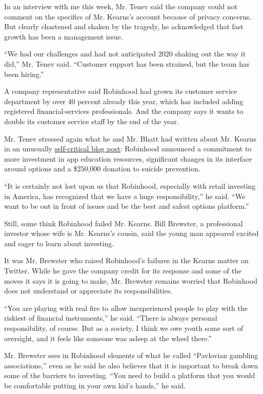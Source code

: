 In an interview with me this week, Mr. Tenev said the company could not
comment on the specifics of Mr. Kearns's account because of privacy
concerns. But clearly chastened and shaken by the tragedy, he
acknowledged that fast growth has been a management issue.

``We had our challenges and had not anticipated 2020 shaking out the way
it did,'' Mr. Tenev said. ``Customer support has been strained, but the
team has been hiring.''

A company representative said Robinhood had grown its customer service
department by over 40 percent already this year, which has included
adding registered financial-services professionals. And the company says
it wants to double its customer service staff by the end of the year.

Mr. Tenev stressed again what he and Mr. Bhatt had written about Mr.
Kearns in an unusually \href{https://blog.robinhood.com/}{self-critical
blog post}: Robinhood announced a commitment to more investment in app
education resources, significant changes in its interface around options
and a \$250,000 donation to suicide prevention.

``It is certainly not lost upon us that Robinhood, especially with
retail investing in America, has recognized that we have a huge
responsibility,'' he said. ``We want to be out in front of issues and be
the best and safest options platform.''

Still, some think Robinhood failed Mr. Kearns. Bill Brewster, a
professional investor whose wife is Mr. Kearns's cousin, said the young
man appeared excited and eager to learn about investing.

It was Mr. Brewster who raised Robinhood's failures in the Kearns matter
on Twitter. While he gave the company credit for its response and some
of the moves it says it is going to make, Mr. Brewster remains worried
that Robinhood does not understand or appreciate its responsibilities.

``You are playing with real fire to allow inexperienced people to play
with the riskiest of financial instruments,'' he said. ``There is always
personal responsibility, of course. But as a society, I think we owe
youth some sort of oversight, and it feels like someone was asleep at
the wheel there.''

Mr. Brewster sees in Robinhood elements of what he called ``Pavlovian
gambling associations,'' even as he said he also believes that it is
important to break down some of the barriers to investing. ``You need to
build a platform that you would be comfortable putting in your own kid's
hands,'' he said.


